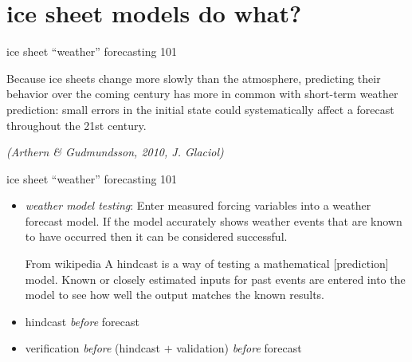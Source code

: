 \documentclass[hide notes,intlimits]{beamer}
\begin{document}
\section{ice sheet models do what?}

\begin{frame}{ice sheet ``weather'' forecasting 101}

Because ice sheets change more slowly than the atmosphere, predicting their
behavior over the coming century has more in common with short-term
weather prediction: \alert{small errors in the initial state could
systematically affect a forecast throughout the 21st century}.

\medskip
\emph{(Arthern \& Gudmundsson, 2010, J. Glaciol)}
\end{frame}


\begin{frame}{ice sheet ``weather'' forecasting 101}

\begin{itemize}
\item \emph{weather model testing}:  Enter measured forcing variables into a weather forecast model.  If the model accurately shows weather events that are known to have occurred then it can be considered successful.
\bigskip

  \begin{block}{From wikipedia} A \alert{hindcast} is a way of testing a
mathematical [prediction] model. Known or closely estimated inputs for past events
are entered into the model to see how well the output matches the
known results.
  \end{block}

\bigskip
\item hindcast \emph{before} forecast
\item verification \emph{before} (hindcast $+$ validation) \emph{before} forecast
\end{itemize}
\end{frame}
\end{document}
